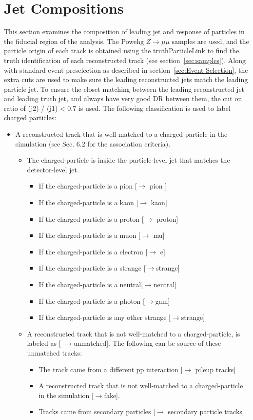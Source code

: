 \section{Jet Compositions}

This section examines the composition of leading jet and response of particles in the fiducial region of the analysis. The Powehg $Z\to \mu\mu$ samples are used, and the particle origin of each track is obtained using the truthParticleLink to find the truth identification of each reconstructed track (see section~\ref{sec:samples}). Along with standard event preselection as described in section~\ref{sec:Event Selection}, the extra cuts are used to make sure the leading reconstructed jets match the leading particle jet. To ensure the closet matching between the leading reconstructed jet and leading truth jet, and always have very good DR between them, the cut on ratio of \pT(j2) / \pT(j1) < 0.7 is used. The following classification is used to label charged particles:
\begin{itemize}
\item A reconstructed track that is well-matched to a charged-particle in the simulation (see Sec. 6.2 for
the association criteria).
\begin{itemize}
\item The charged-particle is inside the particle-level jet that matches the detector-level jet.
\begin{itemize}
\item  If the charged-particle is a pion [$\rightarrow$ pion ]
\item  If the charged-particle is a kaon [$\rightarrow$ kaon]
\item  If the charged-particle is a proton [$\rightarrow$ proton]
\item  If the charged-particle is a muon [$\rightarrow$ mu]
\item  If the charged-particle is a electron [$\rightarrow$ e]
\item  If the charged-particle is a strange [$\rightarrow$strange]
\item  If the charged-particle is a neutral[$\rightarrow$neutral]
\item  If the charged-particle is a photon [$\rightarrow$gam]
\item  If the charged-particle is any other strange [$\rightarrow$strange]
\end{itemize}
\item A reconstructed track that is not well-matched to a charged-particle, is labeled as [ $\rightarrow$unmatched]. The following can be source of these unmatched tracks:
\begin{itemize}
\item The track came from a different pp interaction [$\rightarrow$ pileup tracks]
\item A reconstructed track that is not well-matched to a charged-particle in the simulation [$\rightarrow$fake].
\item Tracks came from secondary particles [$\rightarrow$ secondary particle tracks]
\end{itemize}
\end{itemize}
\end{itemize}

